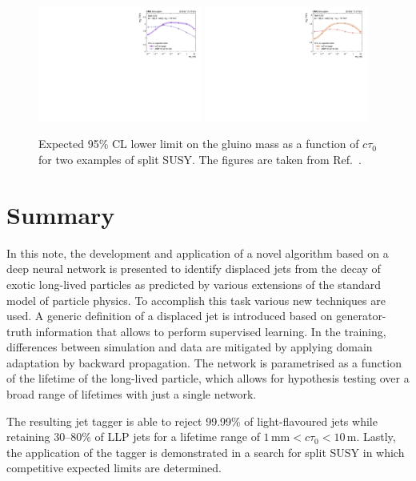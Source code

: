 \documentclass{webofc}
\newcommand{\ctau}{\ensuremath{c\tau_{0}}\xspace}
\begin{document}
\begin{figure}[!ht]
\includegraphics[width=0.48\textwidth]{figs/summaryU.pdf}\hspace{0.03\textwidth}
\includegraphics[width=0.48\textwidth]{figs/summaryC.pdf}
\centering
\caption{\label{fig:limits}Expected 95\% CL lower limit on the gluino mass as a function of \ctau for two examples of split SUSY. The figures are taken from Ref.~\cite{CMS-EXO-19-011}.}
\label{fig-4}
\end{figure}

\section{Summary}
\label{Summary}

In this note, the development and application of a novel algorithm based on a deep neural network is presented to identify displaced jets from the decay of exotic long-lived particles as predicted by various extensions of the standard model of particle physics. To accomplish this task various new techniques are used. A generic definition of a displaced jet is introduced based on generator-truth information that allows to perform supervised learning. In the training, differences between simulation and data are mitigated by applying domain adaptation by backward propagation. The network is parametrised as a function of the lifetime of the long-lived particle, which allows for hypothesis testing over a broad range of lifetimes with just a single network.

The resulting jet tagger is able to reject 99.99\% of light-flavoured jets while retaining 30--80\% of LLP jets for a lifetime range of $1\,\textrm{mm}<\ctau<10\,\textrm{m}$. Lastly, the application of the tagger is demonstrated in a search for split SUSY in which competitive expected limits are determined.
\end{document}
